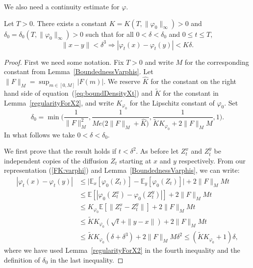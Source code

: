 \documentclass[EJP]{ejpecp} %
\newcommand{\IE}{\mathbb E}
\begin{document}
We also need a continuity estimate for $\varphi$.
\begin{lemma} 
\label{ContinuityVarphi}
Let $T>0$. There exists a constant 
$K=K(T, \| \varphi_0\|_\infty)>0$ and 
$\delta_0=\delta_0(T, \| \varphi_0\|_\infty) >0$ such that 
for all $0 < \delta<\delta_0$ and $0 \leq t \leq T$,
\[ 
 \|x-y\|<\delta^3 \Rightarrow |\varphi_t(x)-\varphi_t(y)|< K\delta.
\]
\end{lemma}
\begin{proof}
First we need some notation. 
Fix $T>0$ and write $M$ for the corresponding constant from 
Lemma~\ref{BoundednessVarphis}.
Let $\| F \|_{M} = \sup_{m \in [0,M]} |F(m)|$.
We reserve $\widehat{K}$ for the constant on the right hand side of 
equation~(\ref{eq:boundDensityXt})
and $\widetilde{K}$ for the constant in Lemma~\ref{regularityForX2},
and write $K_{\varphi_0}$ for the Lipschitz constant of 
$\varphi_0$. Set 
\[ 
\delta_0=\min\Big( \frac{1}{\| F \|_M^{2}},\frac{1}{M e\big(2\| F \|_{M}+ \widehat{K}\big)}, 
    \frac{1}{\widetilde{K} K_{\varphi_0} + 2 \| F \|_M M},  1\Big).
\]
In what follows we take $0< \delta<\delta_0$. 

We first prove that the result holds if $t < \delta^2$. As before
let $Z_t^x$ and $Z_t^y$ be 
independent copies of the diffusion $Z_t$ starting at $x$ and $y$ respectively. 
From our representation (\ref{FK:varphi}) and 
Lemma~\ref{BoundednessVarphis}, we can write:
\begin{align*}
|\varphi_t(x)- \varphi_t(y)| 
&\leq \big|\IE_x[\varphi_0(Z_t)]-\IE_y[\varphi_0(Z_t)]\big| 
    + 2 \| F \|_M M t \\ 
& \leq \IE[|\varphi_0(Z_t^x)-\varphi_0(Z_t^y)|] 
    + 2 \| F \|_M M t  \\ 
&\leq K_{\varphi_0}  \IE[\|Z_t^x-Z_t^y\|] 
    + 2 \| F \|_M M t \\ 
& \leq \widetilde{K} K_{\varphi_0}  (\sqrt{t} + \|y-x\|) 
    + 2 \| F \|_M M t \\ 
& \leq \widetilde{K} K_{\varphi_0} (\delta + \delta^3) 
    + 2 \| F \|_M M \delta^2 
\leq (\widetilde{K} K_{\varphi_0} +1)\delta,
\end{align*}
where we have used Lemma~\ref{regularityForX2} in the fourth inequality and the definition of $\delta_0$ in the last inequality.


\end{proof}
\end{document}
